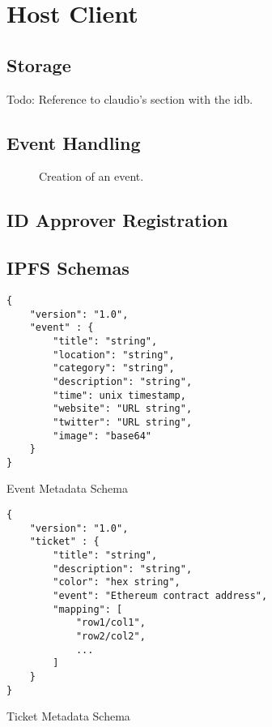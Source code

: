 \section{Host Client}
\subsection{Storage}
Todo: Reference to claudio's section with the idb.

\subsection{Event Handling}

\begin{figure}[H]
    
    \caption{Creation of an event.}
    \label{code:eventCreation}
\end{figure}

\subsection{ID Approver Registration}

\subsection{IPFS Schemas}

\begin{listing}
\begin{verbatim}
{     
    "version": "1.0",
    "event" : {
        "title": "string",
        "location": "string",
        "category": "string",
        "description": "string",
        "time": unix timestamp,
        "website": "URL string",
        "twitter": "URL string",
        "image": "base64"
    }
}
\end{verbatim}
\caption{Event Metadata Schema} 
\label{event-metadata-json-schema}
\end{listing}

\begin{listing}
\begin{verbatim}
{     
    "version": "1.0",
    "ticket" : {
        "title": "string",
        "description": "string",
        "color": "hex string",
        "event": "Ethereum contract address",
        "mapping": [
            "row1/col1",
            "row2/col2",
            ...
        ]
    }
}
\end{verbatim}
\caption{Ticket Metadata Schema} 
\label{ticket-metadata-json-schema}
\end{listing}

